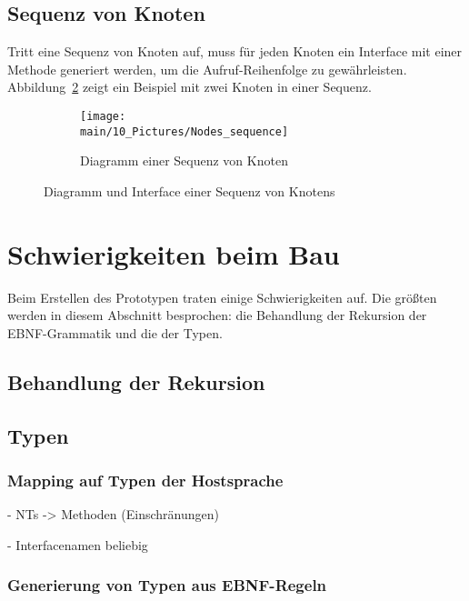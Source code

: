\documentclass[../InterneDSLs.tex]{subfiles}
\begin{document}
\subsection{Sequenz von Knoten}
Tritt eine Sequenz von Knoten auf, muss für jeden Knoten ein Interface mit einer Methode generiert werden, um die Aufruf-Reihenfolge zu gewährleisten. Abbildung~\ref{FIG:SequenceNode} zeigt ein Beispiel mit zwei Knoten in einer Sequenz.
\begin{figure}[ht]
\centering
  \begin{subfigure}[c]{0.49\textwidth}
    \texttt{[image: \\main/10\_Pictures/Nodes\_sequence]}
    \caption{Diagramm einer Sequenz von Knoten}
    \label{FIG:DiagramSequenceNode}
  \end{subfigure}
  \begin{subfigure}[c]{0.49\textwidth}
    
  \end{subfigure}
  \caption{Diagramm und Interface einer Sequenz von Knotens}
  \label{FIG:SequenceNode}
\end{figure}


\section{Schwierigkeiten beim Bau}
Beim Erstellen des Prototypen traten einige Schwierigkeiten auf. Die größten werden in diesem Abschnitt besprochen: die Behandlung der Rekursion der EBNF-Grammatik und die der Typen.

\subsection{Behandlung der Rekursion}

\subsection{Typen}

\subsubsection{Mapping auf Typen der Hostsprache}
- NTs -> Methoden (Einschränungen)

- Interfacenamen beliebig

\subsubsection{Generierung von Typen aus EBNF-Regeln}
\end{document}
